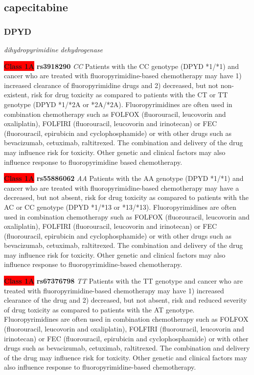 \documentclass{report}
\begin{document}
\subsection{ capecitabine }\subsubsection{ DPYD }
\textit{ dihydropyrimidine dehydrogenase } \newline


\textbf{\colorbox{red} {Class 1A}} \textbf{ rs3918290 } \textit{ CC }
Patients with the CC genotype (DPYD *1/*1) and cancer who are treated with fluoropyrimidine-based chemotherapy may have 1) increased clearance of fluoropyrimidine drugs and 2) decreased, but not non-existent, risk for drug toxicity as compared to patients with the CT or TT genotype (DPYD *1/*2A or *2A/*2A). Fluoropyrimidines are often used in combination chemotherapy such as FOLFOX (fluorouracil, leucovorin and oxaliplatin), FOLFIRI (fluorouracil,  leucovorin and irinotecan) or FEC (fluorouracil, epirubicin and cyclophosphamide) or with other drugs such as bevacizumab, cetuximab, raltitrexed. The combination and delivery of the drug may influence risk for toxicity. Other genetic and clinical factors may also influence response to fluoropyrimidine based chemotherapy.\newline

\textbf{\colorbox{red} {Class 1A}} \textbf{ rs55886062 } \textit{ AA }
Patients with the AA genotype (DPYD *1/*1) and cancer who are treated with fluoropyrimidine-based chemotherapy may have a decreased, but not absent, risk for drug toxicity as compared to patients with the AC or CC genotype (DPYD *1/*13 or *13/*13). Fluoropyrimidines are often used in combination chemotherapy such as FOLFOX (fluorouracil, leucovorin and oxaliplatin), FOLFIRI (fluorouracil, leucovorin and irinotecan) or FEC (fluorouracil, epirubicin and cyclophosphamide) or with other drugs such as bevacizumab, cetuximab, raltitrexed. The combination and delivery of the drug may influence risk for toxicity. Other genetic and clinical factors may also influence response to fluoropyrimidine-based chemotherapy.\newline

\textbf{\colorbox{red} {Class 1A}} \textbf{ rs67376798 } \textit{ TT }
Patients with the TT genotype and cancer who are treated with fluoropyrimidine-based chemotherapy may have 1) increased clearance of the drug and 2) decreased, but not absent, risk and reduced severity of drug toxicity as compared to patients with the AT genotype. Fluoropyrimidines are often used in combination chemotherapy such as FOLFOX (fluorouracil, leucovorin and oxaliplatin), FOLFIRI (fluorouracil, leucovorin and irinotecan) or FEC (fluorouracil, epirubicin and cyclophosphamide) or with other drugs such as bevacizumab, cetuximab, raltitrexed. The combination and delivery of the drug may influence risk for toxicity. Other genetic and clinical factors may also influence response to fluoropyrimidine-based chemotherapy.\newline
\end{document}
